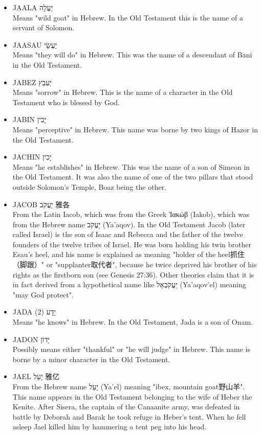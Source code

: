 \begin{itemize} 
\itemsep-.25em  
\item JAALA יַעֲלָה \\
Means "wild goat" in Hebrew. In the Old Testament this is the name of a servant of Solomon.
\item JAASAU יַעֲשָׂי \\
Means "they will do" in Hebrew. This was the name of a descendant of Bani in the Old Testament.
\item JABEZ יַעְבֵץ \\
Means "sorrow" in Hebrew. This is the name of a character in the Old Testament who is blessed by God.
\item JABIN יָבִין \\
Means "perceptive" in Hebrew. This name was borne by two kings of Hazor in the Old Testament.
\item JACHIN יָכִין \\
Means "he establishes" in Hebrew. This was the name of a son of Simeon in the Old Testament. It was also the name of one of the two pillars that stood outside Solomon's Temple, Boaz being the other.
\item JACOB יַעֲקֹב 雅各\\
From the Latin Iacob, which was from the Greek Ἰακώβ (Iakob), which was from the Hebrew name יַעֲקֹב (Ya'aqov). In the Old Testament Jacob (later called Israel) is the son of Isaac and Rebecca and the father of the twelve founders of the twelve tribes of Israel. He was born holding his twin brother Esau's heel, and his name is explained as meaning "holder of the heel抓住（脚跟）" or "supplanter取代者", because he twice deprived his brother of his rights as the firstborn son (see Genesis 27:36). Other theories claim that it is in fact derived from a hypothetical name like יַעֲקֹבְאֵל (Ya'aqov'el) meaning "may God protect".
\item JADA (2) יָדָע \\
Means "he knows" in Hebrew. In the Old Testament, Jada is a son of Onam.
\item JADON יָדוֹן \\
Possibly means either "thankful" or "he will judge" in Hebrew. This name is borne by a minor character in the Old Testament.
\item JAEL יָעֵל 雅亿\\
From the Hebrew name יָעֵל (Ya'el) meaning "ibex, mountain goat野山羊". This name appears in the Old Testament belonging to the wife of Heber the Kenite. After Sisera, the captain of the Canaanite army, was defeated in battle by Deborah and Barak he took refuge in Heber's tent. When he fell asleep Jael killed him by hammering a tent peg into his head.

\end{itemize}
